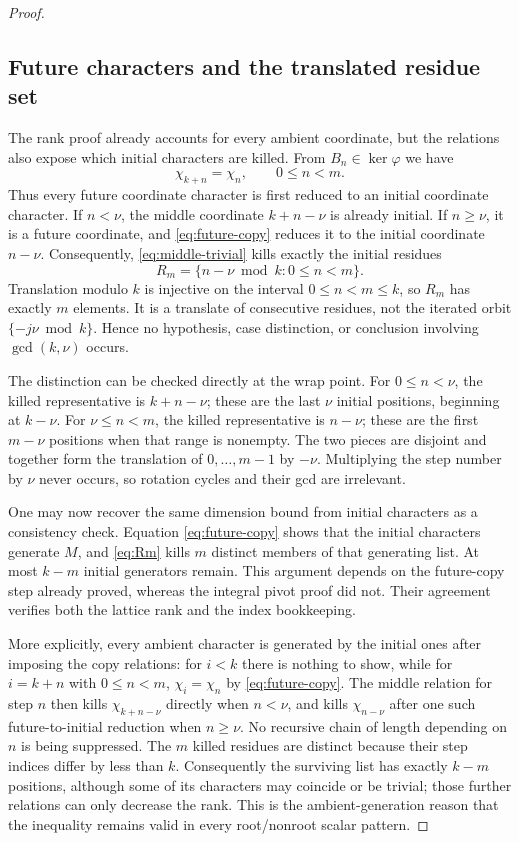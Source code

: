 \documentclass[11pt]{article}
\theoremstyle{definition}
\theoremstyle{remark}
\begin{document}
\begin{proof}
\subsection{Future characters and the translated residue set}

The rank proof already accounts for every ambient coordinate, but the relations also expose which initial characters are killed.  From $B_n\in\ker\varphi$ we have
\begin{equation}
\chi_{k+n}=\chi_n,
\qquad 0\leq n<m.
\label{eq:future-copy}
\end{equation}
Thus every future coordinate character is first reduced to an initial coordinate character.  If $n<\nu$, the middle coordinate $k+n-\nu$ is already initial.  If $n\geq\nu$, it is a future coordinate, and \eqref{eq:future-copy} reduces it to the initial coordinate $n-\nu$.  Consequently, \eqref{eq:middle-trivial} kills exactly the initial residues
\begin{equation}
R_m=\{n-\nu\bmod k:0\leq n<m\}.
\label{eq:Rm}
\end{equation}
Translation modulo $k$ is injective on the interval $0\leq n<m\leq k$, so $R_m$ has exactly $m$ elements.  It is a translate of consecutive residues, not the iterated orbit $\{-j\nu\bmod k\}$.  Hence no hypothesis, case distinction, or conclusion involving $\gcd(k,\nu)$ occurs.

The distinction can be checked directly at the wrap point.  For
$0\leq n<\nu$, the killed representative is $k+n-\nu$; these are the last
$\nu$ initial positions, beginning at $k-\nu$.  For
$\nu\leq n<m$, the killed representative is $n-\nu$; these are the first
$m-\nu$ positions when that range is nonempty.  The two pieces are disjoint
and together form the translation of $0,\ldots,m-1$ by $-\nu$.  Multiplying
the step number by $\nu$ never occurs, so rotation cycles and their gcd are
irrelevant.

One may now recover the same dimension bound from initial characters as a
consistency check.  Equation \eqref{eq:future-copy} shows that the initial
characters generate $M$, and \eqref{eq:Rm} kills $m$ distinct members of
that generating list.  At most $k-m$ initial generators remain.  This
argument depends on the future-copy step already proved, whereas the
integral pivot proof did not.  Their agreement verifies both the lattice rank
and the index bookkeeping.

More explicitly, every ambient character is generated by the initial
ones after imposing the copy relations: for $i<k$ there is nothing to show,
while for $i=k+n$ with $0\leq n<m$,
$\chi_i=\chi_n$ by \eqref{eq:future-copy}.  The middle relation for step
$n$ then kills $\chi_{k+n-\nu}$ directly when $n<\nu$, and kills
$\chi_{n-\nu}$ after one such future-to-initial reduction when
$n\geq\nu$.  No recursive chain of length depending on $n$ is being
suppressed.  The $m$ killed residues are distinct because their step indices
differ by less than $k$.  Consequently the surviving list has exactly
$k-m$ positions, although some of its characters may coincide or be
trivial; those further relations can only decrease the rank.  This is the
ambient-generation reason that the inequality remains valid in every
root/nonroot scalar pattern.


\end{proof}
\end{document}
